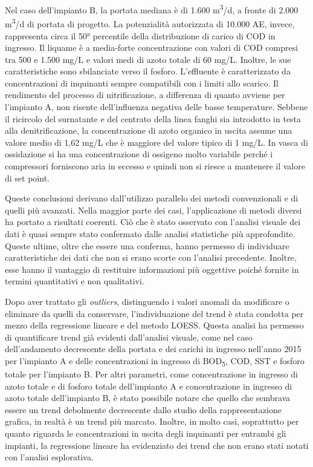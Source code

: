 Nel caso dell'impianto B, la portata mediana è di 1.600 m\textsuperscript{3}/d, a fronte di 2.000 m\textsuperscript{3}/d di portata di progetto. La potenzialità autorizzata di 10.000 AE, invece, rappresenta circa il 50° percentile della distribuzione di carico di COD in ingresso.
Il liquame è a media-forte concentrazione con valori di COD compresi tra 500 e 1.500 mg/L e valori medi di azoto totale di 60 mg/L. Inoltre, le sue caratteristiche sono sbilanciate verso il fosforo.
L'effluente è caratterizzato da concentrazioni di inquinanti sempre compatibili con i limiti allo scarico.
Il rendimento del processo di nitrificazione, a differenza di quanto avviene per l'impianto A, non risente dell'influenza negativa delle basse temperature.
Sebbene il ricircolo del surnatante e del centrato della linea fanghi sia introdotto in testa alla denitrificazione, la concentrazione di azoto organico in uscita assume una valore medio di 1,62 mg/L che è maggiore del valore tipico di 1 mg/L.
In vasca di ossidazione si ha una concentrazione di ossigeno molto variabile perché i compressori forniscono aria in eccesso e quindi non si riesce a mantenere il valore di set point.

Queste conclusioni derivano dall'utilizzo parallelo dei metodi convenzionali e di quelli più avanzati.
Nella maggior parte dei casi, l'applicazione di metodi diversi ha portato a risultati coerenti. Ciò che è stato osservato con l'analisi visuale dei dati è quasi sempre stato confermato dalle analisi statistiche più approfondite. Queste ultime, oltre che essere una conferma, hanno permesso di individuare caratteristiche dei dati che non si erano scorte con l'analisi precedente. Inoltre, esse hanno il vantaggio di restituire informazioni più oggettive poiché fornite in termini quantitativi e non qualitativi.

Dopo aver trattato gli \textit{outliers}, distinguendo i valori anomali da modificare o eliminare da quelli da conservare, l'individuazione del trend è stata condotta per mezzo della regressione lineare e del metodo LOESS. Questa analisi ha permesso di quantificare trend già evidenti dall'analisi visuale, come nel caso dell'andamento decrescente della portata e dei carichi in ingresso nell'anno 2015 per l'impianto A e delle concentrazioni in ingresso di BOD\textsubscript{5}, COD, SST e fosforo totale per l'impianto B. Per altri parametri, come concentrazione in ingresso di azoto totale e di fosforo totale dell'impianto A e concentrazione in ingresso di azoto totale dell'impianto B, è stato possibile notare che quello che sembrava essere un trend debolmente decrescente dallo studio della rappresentazione grafica, in realtà è un trend più marcato. Inoltre, in molto casi, soprattutto per quanto riguarda le concentrazioni in uscita degli inquinanti per entrambi gli impianti, la regressione lineare ha evidenziato dei trend che non erano stati notati con l'analisi esplorativa.

